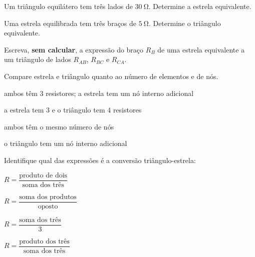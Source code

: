 \blocofixacao
\begin{questao}[1]{}

Um triângulo equilátero tem três lados de $\SI{30}{\ohm}$. Determine a estrela
equivalente.


\end{questao}
\begin{questao}[1]{}

Uma estrela equilibrada tem três braços de $\SI{5}{\ohm}$. Determine o
triângulo equivalente.


\end{questao}
\begin{questao}[1]{}

Escreva, \textbf{sem calcular}, a expressão do braço $R_B$ de uma estrela
equivalente a um triângulo de lados $R_{AB}$, $R_{BC}$ e $R_{CA}$.


\end{questao}
\begin{questao}[1]{}

Compare estrela e triângulo quanto ao número de elementos e de nós.
\begin{alternativas}[2]
\item ambos têm 3 resistores; a estrela tem um nó interno adicional
\item a estrela tem 3 e o triângulo tem 4 resistores
\item ambos têm o mesmo número de nós
\item o triângulo tem um nó interno adicional
\end{alternativas}


\end{questao}
\begin{questao}[1]{}

Identifique qual das expressões é a conversão triângulo-estrela:
\begin{alternativas}[2]
\item $R=\dfrac{\text{produto de dois}}{\text{soma dos três}}$
\item $R=\dfrac{\text{soma dos produtos}}{\text{oposto}}$
\item $R=\dfrac{\text{soma dos três}}{3}$
\item $R=\dfrac{\text{produto dos três}}{\text{soma dos três}}$
\end{alternativas}


\end{questao}

